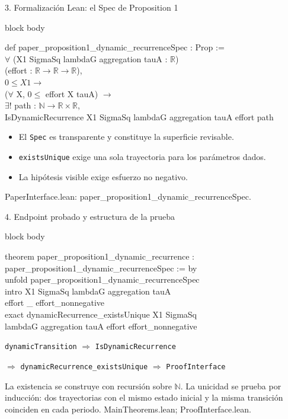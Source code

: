 \documentclass[aspectratio=169,10pt]{beamer}
\newcommand{\src}[1]{\vfill{\tiny\color{gray}#1}}
\newenvironment{leancode}{%
  \begin{beamercolorbox}[sep=1.2ex,wd=\textwidth]{block body}%
  \color{ink}\ttfamily\scriptsize
}{\end{beamercolorbox}}
\begin{document}
\begin{frame}{3. Formalización Lean: el Spec de Proposition 1}
\begin{leancode}
def paper\_proposition1\_dynamic\_recurrenceSpec : Prop :=\\
\quad $\forall$ (X1 SigmaSq lambdaG aggregation tauA : $\mathbb R$)\\
\qquad (effort : $\mathbb R\to\mathbb R\to\mathbb R$),\\
\quad $0\le X1\to$\\
\quad ($\forall$ X, $0\le$ effort X tauA) $\to$\\
\quad $\exists!$ path : $\mathbb N\to\mathbb R\times\mathbb R$,\\
\qquad IsDynamicRecurrence X1 SigmaSq lambdaG aggregation tauA effort path
\end{leancode}
  \begin{itemize}
    \item El \texttt{Spec} es transparente y constituye la superficie revisable.
    \item \texttt{existsUnique} exige una sola trayectoria para los parámetros dados.
    \item La hipótesis visible exige esfuerzo no negativo.
  \end{itemize}
  \src{PaperInterface.lean: paper\_proposition1\_dynamic\_recurrenceSpec.}
\end{frame}

\begin{frame}{4. Endpoint probado y estructura de la prueba}
\begin{leancode}
theorem paper\_proposition1\_dynamic\_recurrence :\\
\quad paper\_proposition1\_dynamic\_recurrenceSpec := by\\
\quad unfold paper\_proposition1\_dynamic\_recurrenceSpec\\
\quad intro X1 SigmaSq lambdaG aggregation tauA\\
\qquad effort \_ effort\_nonnegative\\
\quad exact dynamicRecurrence\_existsUnique X1 SigmaSq\\
\qquad lambdaG aggregation tauA effort effort\_nonnegative
\end{leancode}
  \begin{center}
    \small
    \texttt{dynamicTransition} $\Longrightarrow$
    \texttt{IsDynamicRecurrence}\par\smallskip
    $\Longrightarrow$ \texttt{dynamicRecurrence\_existsUnique}
    $\Longrightarrow$ \texttt{ProofInterface}
  \end{center}
  La existencia se construye con recursión sobre $\mathbb N$. La unicidad se
  prueba por inducción: dos trayectorias con el mismo estado inicial y la misma
  transición coinciden en cada periodo.
  \src{MainTheorems.lean; ProofInterface.lean.}
\end{frame}
\end{document}
